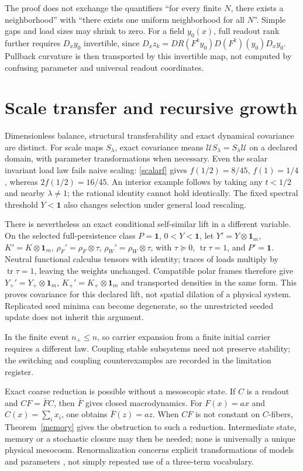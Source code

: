 \documentclass[11pt,letterpaper]{article}
\newcommand{\tr}{\operatorname{tr}}
\newcommand{\Id}{\mathbf 1}
\theoremstyle{definition}
\numberwithin{equation}{section}
\begin{document}
The proof does not exchange the quantifiers ``for every finite $N$, there exists a neighborhood'' with ``there exists one uniform neighborhood for all $N$''. Simple gaps and load sizes may shrink to zero. For a field $y_0(x)$, full readout rank further requires $D_xy_0$ invertible, since $D_xz_k=DR(F^ky_0)D(F^k)(y_0)D_xy_0$. Pullback curvature is then transported by this invertible map, not computed by confusing parameter and universal readout coordinates.

\section{Scale transfer and recursive growth}
Dimensionless balance, structural transferability and exact dynamical covariance are distinct. For scale maps $S_\lambda$, exact covariance means $\mathcal U S_\lambda=S_\lambda\mathcal U$ on a declared domain, with parameter transformations when necessary. Even the scalar invariant load law fails naive scaling: \eqref{scalarf} gives $f(1/2)=8/45$, $f(1)=1/4$, whereas $2f(1/2)=16/45$. An interior example follows by taking any $t<1/2$ and nearby $\lambda\ne1$; the rational identity cannot hold identically. The fixed spectral threshold $Y<\Id$ also changes selection under general load rescaling.

There is nevertheless an exact conditional self-similar lift in a different variable. On the selected full-persistence class $P=\Id$, $0<Y<\Id$, let $Y'=Y\otimes\Id_m$, $K'=K\otimes\Id_m$, $\rho_F'=\rho_F\otimes\tau$, $\rho_W'=\rho_W\otimes\tau$, with $\tau\succeq0$, $\tr\tau=1$, and $P'=\Id$. Neutral functional calculus tensors with identity; traces of loads multiply by $\tr\tau=1$, leaving the weights unchanged. Compatible polar frames therefore give $Y_+'=Y_+\otimes\Id_m$, $K_+'=K_+\otimes\Id_m$ and transported densities in the same form. This proves covariance for this declared lift, not spatial dilation of a physical system. Replicated seed minima can become degenerate, so the unrestricted seeded update does not inherit this argument.

In the finite event $n_+\leq n$, so carrier expansion from a finite initial carrier requires a different law. Coupling stable subsystems need not preserve stability; the switching and coupling counterexamples are recorded in the limitation register.

Exact coarse reduction is possible without a mesoscopic state. If $C$ is a readout and $CF=\bar FC$, then $\bar F$ gives closed macrodynamics. For $F(x)=ax$ and $C(x)=\sum_i x_i$, one obtains $\bar F(z)=az$. When $CF$ is not constant on $C$-fibers, Theorem~\ref{memory} gives the obstruction to such a reduction. Intermediate state, memory or a stochastic closure may then be needed; none is universally a unique physical mesocosm. Renormalization concerns explicit transformations of models and parameters \cite{tongrg}, not simply repeated use of a three-term vocabulary.
\end{document}
